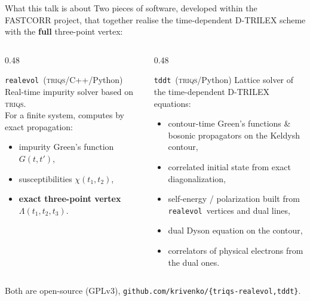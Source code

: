 \documentclass[10pt,aspectratio=169]{beamer}
\newcommand{\realevol}{\texttt{realevol}}
\newcommand{\tddt}{\texttt{tddt}}
\newcommand{\triqs}{\textsc{triqs}}
\begin{document}
\begin{frame}{What this talk is about}
  Two pieces of software, developed within the FASTCORR project,
  that together realise the time-dependent D-TRILEX scheme with the
  \textbf{full} three-point vertex:

  \vspace{1em}
  \begin{columns}[T]
    \begin{column}{0.48\textwidth}
      \begin{block}{\realevol\ (\triqs/C++/Python)}
        \footnotesize
        Real-time impurity solver based on \triqs.\\[2pt]
        For a finite system, computes by exact propagation:
        \begin{itemize}
          \item impurity Green's function $G(t,t')$,
          \item susceptibilities $\chi(t_1,t_2)$,
          \item \textbf{exact three-point vertex}
                $\Lambda(t_1,t_2,t_3)$.
        \end{itemize}
      \end{block}
    \end{column}
    \begin{column}{0.48\textwidth}
      \begin{block}{\tddt\ (\triqs/Python)}
        \footnotesize
        Lattice solver of the time-dependent D-TRILEX equations:
        \begin{itemize}
          \item contour-time Green's functions \& bosonic
                propagators on the Keldysh contour,
          \item correlated initial state from exact diagonalization,
          \item self-energy / polarization built from
                \realevol\ vertices and dual lines,
          \item dual Dyson equation on the contour,
          \item correlators of physical electrons from the dual ones.
        \end{itemize}
      \end{block}
    \end{column}
  \end{columns}
  \vspace{0.7em}
  Both are open-source (GPLv3), \texttt{github.com/krivenko/\{triqs-realevol,tddt\}}.
\end{frame}
\end{document}
